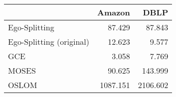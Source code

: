 \begin{tabular}{lrr}
\toprule
{} &   Amazon &     DBLP \\
\midrule
Ego-Splitting            &   87.429 &   87.843 \\
Ego-Splitting (original) &   12.623 &    9.577 \\
GCE                      &    3.058 &    7.769 \\
MOSES                    &   90.625 &  143.999 \\
OSLOM                    & 1087.151 & 2106.602 \\
\bottomrule
\end{tabular}
